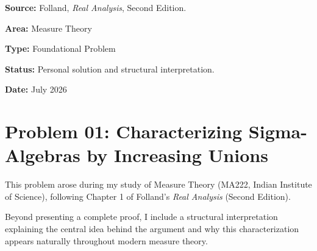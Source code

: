 \noindent\textbf{Source:}
Folland, \emph{Real Analysis}, Second Edition.

\medskip

\noindent\textbf{Area:}
Measure Theory

\medskip

\noindent\textbf{Type:}
Foundational Problem

\medskip

\noindent\textbf{Status:}
Personal solution and structural interpretation.

\medskip

\noindent\textbf{Date:}
July 2026
\section*{Problem 01: Characterizing Sigma-Algebras by Increasing Unions}

This problem arose during my study of Measure Theory (MA222, Indian Institute of Science), following Chapter 1 of Folland's \emph{Real Analysis} (Second Edition).

Beyond presenting a complete proof, I include a structural interpretation explaining the central idea behind the argument and why this characterization appears naturally throughout modern measure theory.  

